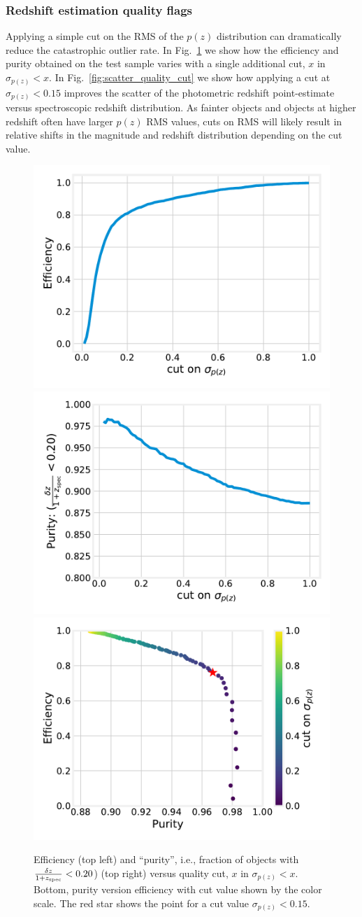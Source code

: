\subsubsection{Redshift estimation quality flags}
\label{sec:performance:pz:flag}

Applying a simple cut on the RMS of the $p(z)$ distribution can dramatically reduce the catastrophic outlier rate.  In Fig.~\ref{fig:perf_quality_cut} we show how the efficiency and purity obtained on the test sample varies with a single additional cut, $x$ in $\sigma_{p(z)} < x$.   In Fig.~\ref{fig:scatter_quality_cut} we show how applying a cut at $\sigma_{p(z)} < 0.15$ improves the scatter of the photometric redshift point-estimate versus spectroscopic redshift distribution.  As fainter objects and objects at higher redshift often have larger $p(z)$ RMS values, cuts on RMS will likely result in relative shifts in the magnitude and redshift distribution depending on the cut value.

\begin{figure}
    \centering
    \includegraphics[width=0.45\linewidth]{figures/efficiency.pdf}
    \includegraphics[width=0.45\linewidth]{figures/purity.pdf} \\
    \includegraphics[width=0.45\linewidth]{figures/purity_v_effic.pdf} \\
    \caption{Efficiency (top left) and ``purity'', i.e., fraction of objects with $\frac{\delta z}{1 + z_{\rm spec}} < 0.20$) (top right) versus quality cut, $x$ in $\sigma_{p(z)} < x$.   Bottom, purity version efficiency with cut value shown by the color scale.   The red star shows the point for a cut value  $\sigma_{p(z)} < 0.15$.}
    \label{fig:perf_quality_cut}
\end{figure}


